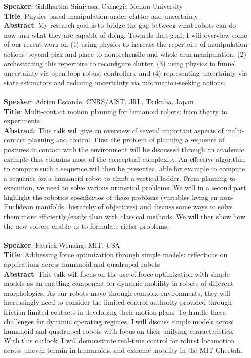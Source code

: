 \documentclass[conference]{IEEEtran}
\begin{document}
\textbf{Speaker}: Siddhartha Srinivasa, Carnegie Mellon University \\ 
\textbf{Title}: Physics-based manipulation under clutter and uncertainty \\
\textbf{Abstract}: My research goal is to bridge the gap between what robots can do now and what they are capable of doing. Towards that goal, I will overview some of our recent work on (1) using physics to increase the repertoire of manipulation actions beyond pick-and-place to nonprehensile and whole-arm manipulation, (2) orchestrating this repertoire to reconfigure clutter, (3) using physics to funnel uncertainty via open-loop robust controllers, and (4) representing uncertainty via state estimators and reducing uncertainty via information-seeking actions. \\ \\
\textbf{Speaker}: Adrien Escande, CNRS/AIST, JRL, Tsukuba, Japan \\
\textbf{Title}: Multi-contact motion planning for humanoid robots: from theory to experiments \\ 
\textbf{Abstract}: This talk will give an overview of several important aspects of multi-contact planning and control. First the problem of planning a sequence of postures in contact with the environment will be discussed through an academic example that contains most of the conceptual complexity. An effective algorithm to compute such a sequence will then be presented, able for example to compute a sequence for a humanoid robot to climb a vertical ladder. From planning to execution, we need to solve various numerical problems. We will in a second part highlight the robotics specificities of these problems (variables living on non-Euclidean manifolds, hierarchy of objectives) and discuss some ways to solve them more efficiently/easily than with classical methods. We will then show how the new solvers enable us to formulate richer problems. \\ \\
\textbf{Speaker}: Patrick Wensing, MIT, USA \\
\textbf{Title}:  Addressing force optimization through simple models: reflections on applications across humanoid and quadruped robots \\
\textbf{Abstract}:  This talk will focus on the use of force optimization with simple models as an enabling component for dynamic mobility in robots of different morphologies. As our robots move through complex environments, they will increasingly need to consider the limited control authority provided through friction-limited contacts in developing their motion plans.  To handle these challenges for dynamic operating regimes, I will discuss simple models across humanoid and quadruped robots with focus on their unifying characteristics.  With this outlook, I will demonstrate real-time control for robust locomotion across uneven terrain in humanoids, and extreme mobility in the MIT Cheetah.\\ \\
\end{document}
